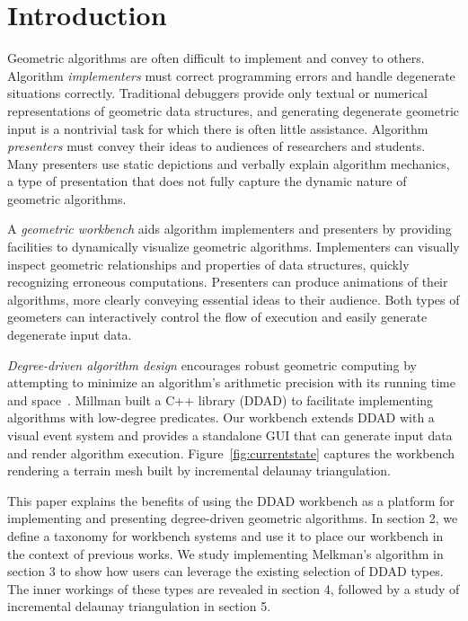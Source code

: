 \section{Introduction}

Geometric algorithms are often difficult to implement and convey to others.
Algorithm \emph{implementers} must correct programming errors and handle
degenerate situations correctly. Traditional debuggers provide only textual or
numerical representations of geometric data structures, and generating
degenerate geometric input is a nontrivial task for which there is often little
assistance. Algorithm \emph{presenters} must convey their ideas to audiences of
researchers and students. Many presenters use static depictions and verbally
explain algorithm mechanics, a type of presentation that does not fully capture
the dynamic nature of geometric algorithms.

A \emph{geometric workbench} aids algorithm implementers and presenters by
providing facilities to dynamically visualize geometric algorithms. Implementers
can visually inspect geometric relationships and properties of data structures,
quickly recognizing erroneous computations. Presenters can produce
animations of their algorithms, more clearly conveying essential
ideas to their audience. Both types of geometers can interactively control the
flow of execution and easily generate degenerate input data.


\emph{Degree-driven algorithm design} encourages robust geometric computing by
attempting to minimize an algorithm's arithmetic precision with its running time
and space~\cite{millman2012degree}. Millman built a C++ library (DDAD) to
facilitate implementing algorithms with low-degree predicates. Our workbench
extends DDAD with a visual event system and provides a standalone GUI that can
generate input data and render algorithm execution.
Figure~\ref{fig:currentstate} captures the workbench rendering a terrain mesh
built by incremental delaunay triangulation.

This paper explains the benefits of using the DDAD workbench as a platform for
implementing and presenting degree-driven geometric algorithms. In section 2, we
define a taxonomy for workbench systems and use it to place our workbench in the
context of previous works. We study implementing Melkman's algorithm in section
3 to show how users can leverage the existing selection of DDAD types. The inner
workings of these types are revealed in section 4, followed by a study of
incremental delaunay triangulation in section 5. 
% 
% 
% 

